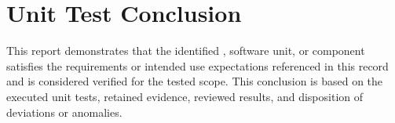 \newpage
\section{Unit Test Conclusion}
This report demonstrates that the identified \stdCfgItem, software unit, or
component satisfies the requirements or intended use expectations referenced in
this record and is considered verified for the tested scope.  This conclusion is
based on the executed unit tests, retained evidence, reviewed results, and
disposition of deviations or anomalies.
